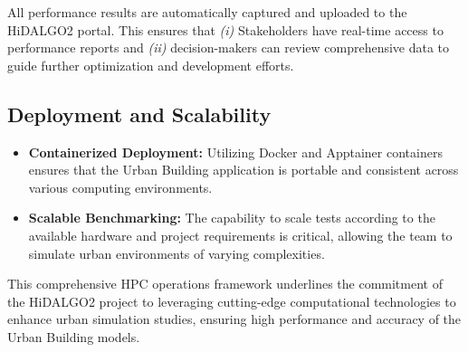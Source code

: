 All performance results are automatically captured and uploaded to the HiDALGO2 portal. This ensures that \textit{(i)} Stakeholders have real-time access to performance reports and \textit{(ii)} decision-makers can review comprehensive data to guide further optimization and development efforts.

\subsection{Deployment and Scalability}
\begin{itemize}
    \item \textbf{Containerized Deployment:} Utilizing Docker and Apptainer containers ensures that the Urban Building application is portable and consistent across various computing environments.
    \item \textbf{Scalable Benchmarking:} The capability to scale tests according to the available hardware and project requirements is critical, allowing the team to simulate urban environments of varying complexities.
\end{itemize}

This comprehensive HPC operations framework underlines the commitment of the HiDALGO2 project to leveraging cutting-edge computational technologies to enhance urban simulation studies, ensuring high performance and accuracy of the Urban Building models.
